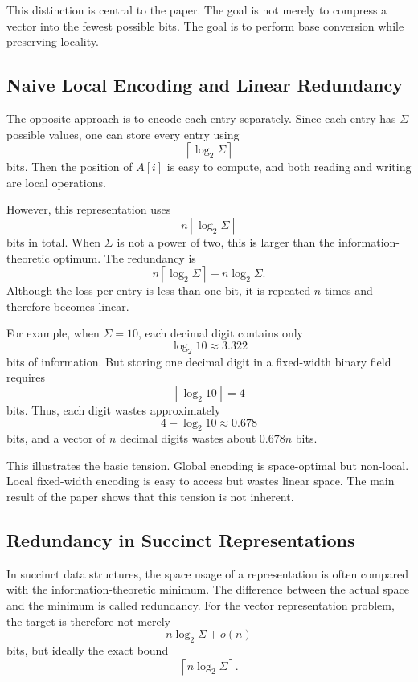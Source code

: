This distinction is central to the paper. The goal is not merely to compress a vector into the fewest possible bits. The goal is to perform base conversion while preserving locality.

\subsection{Naive Local Encoding and Linear Redundancy}

The opposite approach is to encode each entry separately. Since each entry has \(\Sigma\) possible values, one can store every entry using
\[
    \left\lceil \log_2 \Sigma \right\rceil
\]
bits. Then the position of \(A[i]\) is easy to compute, and both reading and writing are local operations.

However, this representation uses
\[
    n \left\lceil \log_2 \Sigma \right\rceil
\]
bits in total. When \(\Sigma\) is not a power of two, this is larger than the information-theoretic optimum. The redundancy is
\[
    n\left\lceil \log_2 \Sigma \right\rceil
    -
    n\log_2 \Sigma.
\]
Although the loss per entry is less than one bit, it is repeated \(n\) times and therefore becomes linear.

For example, when \(\Sigma = 10\), each decimal digit contains only
\[
    \log_2 10 \approx 3.322
\]
bits of information. But storing one decimal digit in a fixed-width binary field requires
\[
    \left\lceil \log_2 10 \right\rceil = 4
\]
bits. Thus, each digit wastes approximately
\[
    4 - \log_2 10 \approx 0.678
\]
bits, and a vector of \(n\) decimal digits wastes about \(0.678n\) bits.

This illustrates the basic tension. Global encoding is space-optimal but non-local. Local fixed-width encoding is easy to access but wastes linear space. The main result of the paper shows that this tension is not inherent.

\subsection{Redundancy in Succinct Representations}

In succinct data structures, the space usage of a representation is often compared with the information-theoretic minimum. The difference between the actual space and the minimum is called redundancy. For the vector representation problem, the target is therefore not merely
\[
    n\log_2 \Sigma + o(n)
\]
bits, but ideally the exact bound
\[
    \left\lceil n \log_2 \Sigma \right\rceil.
\]

